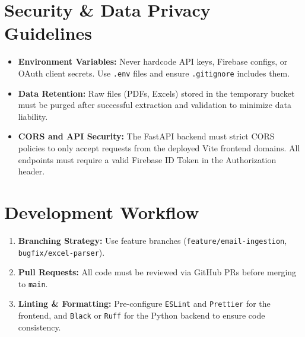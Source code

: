 \documentclass[11pt,a4paper]{article}
\begin{document}
\section{Security \& Data Privacy Guidelines}
\begin{itemize}[leftmargin=*]
    \item \textbf{Environment Variables:} Never hardcode API keys, Firebase configs, or OAuth client secrets. Use \texttt{.env} files and ensure \texttt{.gitignore} includes them.
    \item \textbf{Data Retention:} Raw files (PDFs, Excels) stored in the temporary bucket must be purged after successful extraction and validation to minimize data liability.
    \item \textbf{CORS and API Security:} The FastAPI backend must strict CORS policies to only accept requests from the deployed Vite frontend domains. All endpoints must require a valid Firebase ID Token in the Authorization header.
\end{itemize}

\section{Development Workflow}
\begin{enumerate}
    \item \textbf{Branching Strategy:} Use feature branches (\texttt{feature/email-ingestion}, \texttt{bugfix/excel-parser}).
    \item \textbf{Pull Requests:} All code must be reviewed via GitHub PRs before merging to \texttt{main}.
    \item \textbf{Linting \& Formatting:} Pre-configure \texttt{ESLint} and \texttt{Prettier} for the frontend, and \texttt{Black} or \texttt{Ruff} for the Python backend to ensure code consistency.
\end{enumerate}
\end{document}
